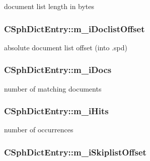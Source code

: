 document list length in bytes 

\hypertarget{structCSphDictEntry_a3115d67c4bf83b750e7d84be6f919a10}{
\subsubsection[{m\-\_\-i\-Doclist\-Offset}]{ C\-Sph\-Dict\-Entry\-::m\-\_\-i\-Doclist\-Offset}}\label{structCSphDictEntry_a3115d67c4bf83b750e7d84be6f919a10}


absolute document list offset (into .spd) 

\hypertarget{structCSphDictEntry_a8a8f91e5c3644e336be6ea3354fac8f8}{
\subsubsection[{m\-\_\-i\-Docs}]{ C\-Sph\-Dict\-Entry\-::m\-\_\-i\-Docs}}\label{structCSphDictEntry_a8a8f91e5c3644e336be6ea3354fac8f8}


number of matching documents 

\hypertarget{structCSphDictEntry_a628b204b5451e9c5126068154f3fe6b9}{
\subsubsection[{m\-\_\-i\-Hits}]{ C\-Sph\-Dict\-Entry\-::m\-\_\-i\-Hits}}\label{structCSphDictEntry_a628b204b5451e9c5126068154f3fe6b9}


number of occurrences 

\hypertarget{structCSphDictEntry_abfb6b23a4b17ee0d0b8a4c923f1a575a}{
\subsubsection[{m\-\_\-i\-Skiplist\-Offset}]{ C\-Sph\-Dict\-Entry\-::m\-\_\-i\-Skiplist\-Offset}}\label{structCSphDictEntry_abfb6b23a4b17ee0d0b8a4c923f1a575a}


